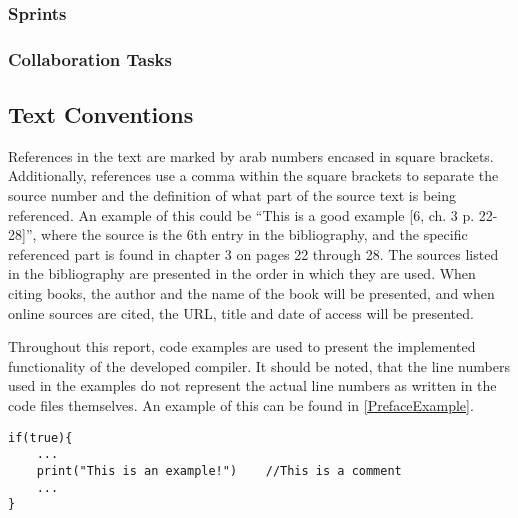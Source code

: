 \subsubsection{Sprints}

\subsubsection{Collaboration Tasks}

\subsection{Text Conventions}
 References in the text are marked by arab numbers encased in square
brackets.
Additionally, references use a comma within the square brackets to separate the
source number and the definition of what part of the source text is being referenced.
An example of this could be ``This is a good example {[}6, ch. 3 p. 22-28{]}'',
where the source is the 6th entry in the bibliography, and the specific
referenced part is found in chapter 3 on pages 22 through 28. The sources listed
in the bibliography are presented in the order in which they are used. When
citing books, the author and the name of the book will be presented, and when
online sources are cited, the URL, title and date of access will be
presented.\nl

Throughout this report, code examples are used to present the implemented
functionality of the developed compiler. It should be noted, that the line
numbers used in the examples do not represent the actual line numbers as written in the
code files themselves. An example of this can be found in
\autoref{PrefaceExample}.\nl

\begin{minipage}[H]{\linewidth}
\begin{lstlisting}[caption = {Example code.}, label ={PrefaceExample} ]
if(true){
	...
	print("This is an example!")	//This is a comment
	...
}
\end{lstlisting} 
\end{minipage}


